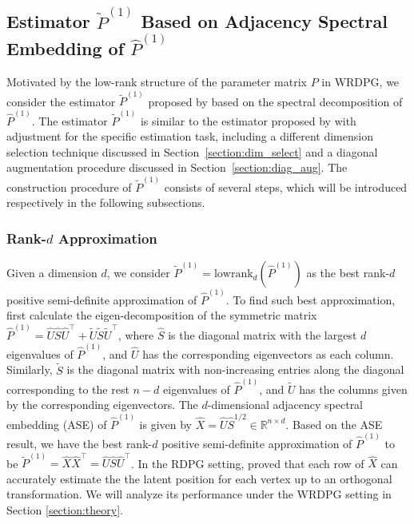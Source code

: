 \documentclass[a4paper]{article}
\renewcommand{\hat}{\widehat}
\renewcommand{\tilde}{\widetilde}
\begin{document}
\subsection{Estimator $\widetilde{P}^{(1)}$ Based on Adjacency Spectral Embedding of $\hat{P}^{(1)}$}

Motivated by the low-rank structure of the parameter matrix $P$ in WRDPG, we consider the estimator $\widetilde{P}^{(1)}$ proposed by \citet{tang2016law} based on the spectral decomposition of $\hat{P}^{(1)}$. The estimator $\widetilde{P}^{(1)}$ is similar to the estimator proposed by \citet{chatterjee2015matrix} with adjustment for the specific estimation task, including a different dimension selection technique discussed in Section~\ref{section:dim_select} and a diagonal augmentation procedure discussed in Section~\ref{section:diag_aug}. The construction procedure of $\widetilde{P}^{(1)}$ consists of several steps, which will be introduced respectively in the following subsections.

\subsubsection{Rank-$d$ Approximation}

Given a dimension $d$, we consider $\widetilde{P}^{(1)} = \mathrm{lowrank}_d(\hat{P}^{(1)})$ as the best rank-$d$ positive semi-definite approximation of $\hat{P}^{(1)}$. To find such best approximation, first calculate the eigen-decomposition of the symmetric matrix $\hat{P}^{(1)} = \hat{U} \hat{S} \hat{U}^{\top} + \widetilde{U} \widetilde{S} \widetilde{U}^{\top}$, where $\hat{S}$ is the diagonal matrix with the largest $d$ eigenvalues of $\hat{P}^{(1)}$, and $\hat{U}$ has the corresponding eigenvectors as each column. Similarly, $\tilde{S}$ is the diagonal matrix with non-increasing entries along the diagonal corresponding to the rest $n - d$ eigenvalues of $\hat{P}^{(1)}$, and $\tilde{U}$ has the columns given by the corresponding eigenvectors.
The $d$-dimensional adjacency spectral embedding (ASE) of $\hat{P}^{(1)}$ is given by $\hat{X}=\hat{U} \hat{S}^{1/2}\in \mathbb{R}^{n \times d}$.
Based on the ASE result, we have the best rank-$d$ positive semi-definite approximation of $\hat{P}^{(1)}$ to be $\widetilde{P}^{(1)} = \hat{X} \hat{X}^{\top}=\hat{U}\hat{S}\hat{U}^{\top}$.
In the RDPG setting, \citet{sussman2014consistent} proved that each row of $\hat{X}$ can accurately estimate the the latent position for each vertex up to an orthogonal transformation. We will analyze its performance under the WRDPG setting in Section \ref{section:theory}.
\end{document}
